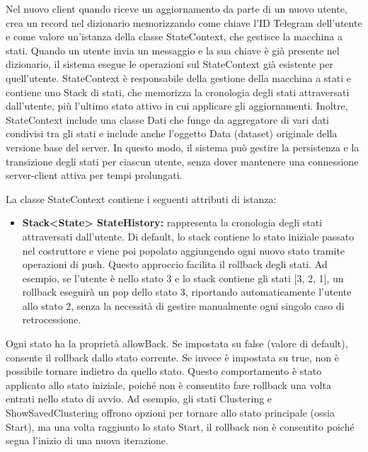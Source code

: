 \begin{enumerate}
    Nel nuovo client quando riceve un aggiornamento da parte di un nuovo utente, crea un record nel dizionario memorizzando come chiave l'ID Telegram dell'utente e come valore un'istanza della classe StateContext, che gestisce la macchina a stati. Quando un utente invia un messaggio e la sua chiave è già presente nel dizionario, il sistema esegue le operazioni sul StateContext già esistente per quell'utente. StateContext è responsabile della gestione della macchina a stati e contiene uno Stack di stati, che memorizza la cronologia degli stati attraversati dall'utente, più l'ultimo stato attivo in cui applicare gli aggiornamenti. Inoltre, StateContext include una classe Dati che funge da aggregatore di vari dati condivisi tra gli stati e include anche l'oggetto Data (dataset) originale della versione base del server. In questo modo, il sistema può gestire la persistenza e la transizione degli stati per ciascun utente, senza dover mantenere una connessione server-client attiva per tempi prolungati.
    
    La classe StateContext contiene i seguenti attributi di istanza:
    \begin{itemize}
        \item \textbf{Stack<State> StateHistory:} rappresenta la cronologia degli stati attraversati dall'utente. Di default, lo stack contiene lo stato iniziale passato nel costruttore e viene poi popolato aggiungendo ogni nuovo stato tramite operazioni di push. Questo approccio facilita il rollback degli stati. Ad esempio, se l'utente è nello stato 3 e lo stack contiene gli stati [3, 2, 1], un rollback eseguirà un pop dello stato 3, riportando automaticamente l'utente allo stato 2, senza la necessità di gestire manualmente ogni singolo caso di retrocessione.
    \end{itemize}
    
    Ogni stato ha la proprietà allowBack. Se impostata su false (valore di default), consente il rollback dallo stato corrente. Se invece è impostata su true, non è possibile tornare indietro da quello stato. Questo comportamento è stato applicato allo stato iniziale, poiché non è consentito fare rollback una volta entrati nello stato di avvio. Ad esempio, gli stati Clustering e ShowSavedClustering offrono opzioni per tornare allo stato principale (ossia Start), ma una volta raggiunto lo stato Start, il rollback non è consentito poiché segna l'inizio di una nuova iterazione.
    

\end{enumerate}

